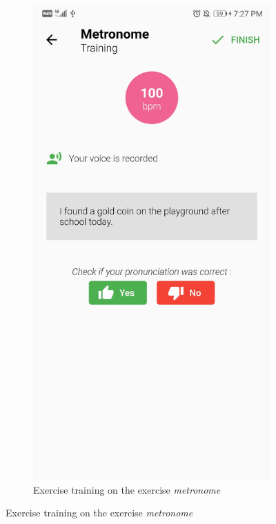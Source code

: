 \begin{appendices}
\begin{landscape}
\begin{figure}[h]
\begin{subfigure}{.25\textwidth}
    \includegraphics[width=.75\linewidth]{content/imgs/screen4.jpg}
    \caption{Exercise training on the exercise \textit{metronome}}
  \end{subfigure}
\end{figure}



\end{landscape}
\end{appendices}
